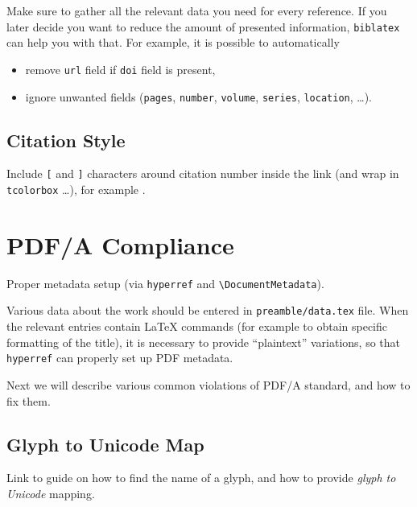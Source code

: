 \begin{remark}
    Make sure to gather all the relevant data you need for every reference.
    If you later decide you want to reduce the amount of presented information, \texttt{biblatex} can help you with that.
    For example, it is possible to automatically
    \begin{itemize}
        \item remove \texttt{url} field if \texttt{doi} field is present,
        \item ignore unwanted fields (\texttt{pages}, \texttt{number}, \texttt{volume}, \texttt{series}, \texttt{location}, \ldots). \qedhere*
    \end{itemize}
\end{remark}

\subsection{Citation Style}%
\label{sub:Citation Style}

Include \texttt{[} and \texttt{]} characters around citation number inside the link (and wrap in \texttt{tcolorbox} \ldots), for example \autocite{TeXtured}.


\section{PDF/A Compliance}%
\label{sec:PDF/A Compliance}

Proper metadata setup (via \texttt{hyperref} and \verb|\DocumentMetadata|).
\begin{remark}
    Various data about the work should be entered in \texttt{preamble/data.tex} file.
    When the relevant entries contain \LaTeX{} commands (for example to obtain specific formatting of the title), it is necessary to provide \enquote{plaintext} variations, so that \texttt{hyperref} can properly set up PDF metadata.
\end{remark}

Next we will describe various common violations of PDF/A standard, and how to fix them.

\subsection{Glyph to Unicode Map}%
\label{sub:Glyph to Unicode Map}

\begin{Todo}
    Link to guide on how to find the name of a glyph, and how to provide \emph{glyph to Unicode} mapping.
\end{Todo}

